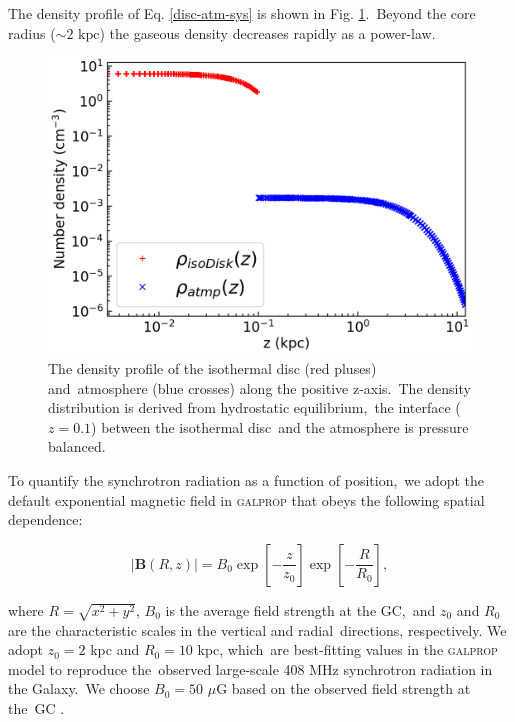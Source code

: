 \documentclass[fleqn,usenatbib,useAMS]{mnras}
\begin{document}
  The density profile of Eq. \ref{disc-atm-sys} is shown in Fig. \ref{fig__initial-density-profile}.\
  Beyond the core radius ($\sim 2 \text{ kpc}$) the gaseous density decreases rapidly as a power-law.


  \begin{figure}
    \includegraphics[width=\columnwidth]{figures/fig__initial-density-profile.png}
    \caption{The density profile of the isothermal disc (red pluses) and\
             atmosphere (blue crosses) along the positive z-axis.\
             The density distribution is derived from hydrostatic equilibrium,\
             the interface ($z=0.1$) between the isothermal disc\
             and the atmosphere is pressure balanced.}
    \label{fig__initial-density-profile}
  \end{figure}



  To quantify the synchrotron radiation as a function of position,\
  we adopt the default exponential magnetic field in \textsc{galprop} \citep{Strong2007}
  that obeys the following spatial dependence:\

  \begin{equation}
     |\mathbf{B}(R, z)|=B_{0}\exp\left[-\frac{z}{z_{0}}\right]\exp\left[-\frac{R}{R_{0}}\right],
     \label{magnetic-field}
  \end{equation}


  where $R=\sqrt{x^{2}+y^{2}}$, $B_{0}$ is the average field strength at the GC,\
  and $z_{0}$ and $R_{0}$ are the characteristic scales in the vertical and radial\
  directions, respectively. We adopt $z_{0} = 2$ kpc and $R_{0} = 10$ kpc, which\
  are best-fitting values in the \textsc{galprop} model to reproduce the\
  observed large-scale 408 MHz synchrotron radiation in the Galaxy.\
  We choose $B_{0} = 50$ $\mu$G based on the observed field strength at the\
  GC \citep{Crocker2010}.
\end{document}
